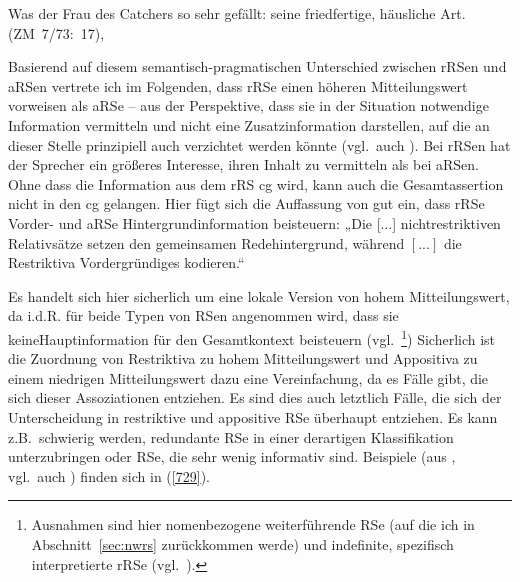 \begin{exe}
	\ex\label{728} 
	Was der Frau des Catchers so sehr gefällt: seine friedfertige, häusliche Art. 
	\hbox{}\hfill\hbox{(ZM 7/73: 17), \citet[74]{Dyhr1978}}	
\end{exe}
Basierend auf diesem semantisch-pragmatischen Unterschied zwischen rRSen und aRSen vertrete ich im Folgenden, dass rRSe einen höheren Mitteilungswert vorweisen als aRSe – aus der Perspektive, dass sie in der Situation notwendige Information vermitteln und nicht eine Zusatzinformation darstellen, auf die an dieser Stelle prinzipiell auch verzichtet werden könnte (vgl.\ auch \citealt[166--167]{Mueller2016a}). Bei rRSen hat der Sprecher ein größeres Interesse, ihren Inhalt zu vermitteln als bei aRSen. Ohne dass die Information aus dem rRS cg wird, kann auch die Gesamtassertion nicht in den cg gelangen. Hier fügt sich die Auffassung von \citet[86]{Abraham2012} gut ein, dass rRSe Vorder- und aRSe Hintergrundinformation beisteuern: „Die [...] nichtrestriktiven Relativsätze setzen den gemeinsamen Redehintergrund, während $[...]$ die Restriktiva Vordergründiges kodieren.“  

Es handelt sich hier sicherlich um eine lokale Version von hohem Mitteilungs\-wert, da i.d.R. für beide Typen von RSen angenommen wird, dass sie keine\linebreak Hauptinformation für den Gesamtkontext beisteuern (vgl.\ \citealt[38--42]{Antomo2015}\footnote{Ausnahmen sind hier nomenbezogene weiterführende RSe (auf die ich in Abschnitt~\ref{sec:nwrs} zurückkommen werde) und indefinite, spezifisch interpretierte rRSe (vgl.\ \citealt[41--42]{Antomo2015}).}) Sicherlich ist die Zuordnung von Restriktiva zu hohem Mitteilungswert und Appositiva zu einem niedrigen Mitteilungswert dazu eine Vereinfachung, da es Fälle gibt, die sich dieser Assoziationen entziehen. Es sind dies auch letztlich Fälle, die sich der Unterscheidung in restriktive und appositive RSe überhaupt entziehen. Es kann z.B.\ schwierig werden, redundante RSe in einer derartigen Klassifikation unterzubringen oder RSe, die sehr wenig informativ sind. Beispiele (aus \citealt[14/17/33]{Weinert2004}, vgl.\ auch \citeyear[28--38]{Weinert2004}) finden sich in (\ref{729}).

